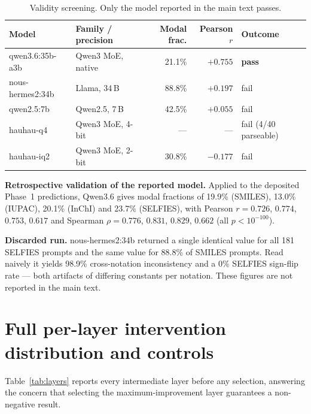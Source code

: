 \documentclass[11pt,a4paper]{article}
\begin{document}
\begin{table}[h]
\centering
\caption{Validity screening. Only the model reported in the main text passes.}
\label{tab:valid}
\small
\begin{tabular}{llrrl}
\toprule
Model & Family / precision & Modal frac. & Pearson $r$ & Outcome \\
\midrule
qwen3.6:35b-a3b   & Qwen3 MoE, native & 21.1\% & $+0.755$ & \textbf{pass} \\
nous-hermes2:34b  & Llama, 34\,B      & 88.8\% & $+0.197$ & fail \\
qwen2.5:7b        & Qwen2.5, 7\,B     & 42.5\% & $+0.055$ & fail \\
hauhau-q4         & Qwen3 MoE, 4-bit  & ---    & ---      & fail (4/40 parseable) \\
hauhau-iq2        & Qwen3 MoE, 2-bit  & 30.8\% & $-0.177$ & fail \\
\bottomrule
\end{tabular}
\end{table}

\noindent \textbf{Retrospective validation of the reported model.} Applied to the deposited Phase~1
predictions, Qwen3.6 gives modal fractions of 19.9\% (SMILES), 13.0\% (IUPAC), 20.1\% (InChI) and
23.7\% (SELFIES), with Pearson $r = 0.726$, $0.774$, $0.753$, $0.617$ and Spearman
$\rho = 0.776$, $0.831$, $0.829$, $0.662$ (all $p < 10^{-100}$).

\noindent \textbf{Discarded run.} nous-hermes2:34b returned a single identical value for all 181
SELFIES prompts and the same value for 88.8\% of SMILES prompts. Read naively it yields 98.9\%
cross-notation inconsistency and a 0\% SELFIES sign-flip rate --- both artifacts of differing
constants per notation. These figures are not reported in the main text.

\section{Full per-layer intervention distribution and controls}

Table~\ref{tab:layers} reports every intermediate layer before any selection, answering the concern
that selecting the maximum-improvement layer guarantees a non-negative result.
\end{document}
